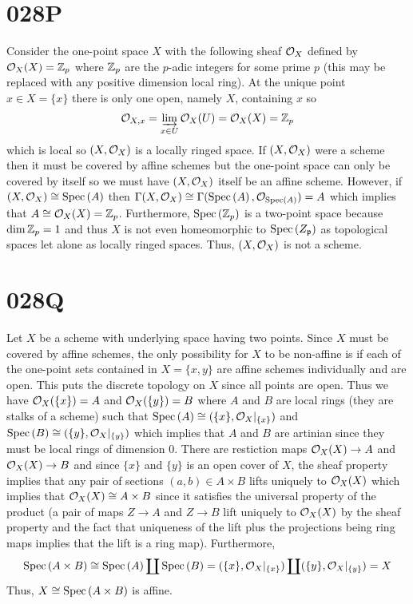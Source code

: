 \documentclass[12pt]{article}
\begin{document}
\section{028P}

Consider the one-point space $X$ with the following sheaf $\mathcal{O}_{X}$ defined by $\mathcal{O}_{X}(X) = \mathbb{Z}_p$ where $\mathbb{Z}_p$ are the $p$-adic integers for some prime $p$ (this may be replaced with any positive dimension local ring). At the unique point $x \in X = \{x\}$ there is only one open, namely $X$, containing $x$ so 
\[ \mathcal{O}_{X, x} = \varinjlim\limits_{x \in U} \mathcal{O}_{X} (U) = \mathcal{O}_{X}(X) = \mathbb{Z}_p \]
which is local so $(X, \mathcal{O}_{X})$ is a locally ringed space. If $(X, \mathcal{O}_{X})$ were a scheme then it must be covered by affine schemes but the one-point space can only be covered by itself so we must have $(X, \mathcal{O}_{X})$ itself be an affine scheme. However, if $(X, \mathcal{O}_{X}) \cong \mathrm{Spec}\left( A \right)$ then $\Gamma(X, \mathcal{O}_{X}) \cong \Gamma(\mathrm{Spec}\left( A \right), \mathcal{O}_{\mathrm{Spec}\left( A \right)}) = A$ which implies that $A \cong \mathcal{O}_{X}(X) = \mathbb{Z}_p$. Furthermore, $\mathrm{Spec}\left( \mathbb{Z}_p \right)$ is a two-point space because $\dim{\mathbb{Z}_p} = 1$ and thus $X$ is not even homeomorphic to $\mathrm{Spec}\left( Z_{\mathfrak{p}} \right)$ as topological spaces let alone as locally ringed spaces. Thus, $(X, \mathcal{O}_{X})$ is not a scheme.  

\section{028Q}

Let $X$ be a scheme with underlying space having two points. Since $X$ must be covered by affine schemes, the only possibility for $X$ to be non-affine is if each of the one-point sets contained in $X = \{x, y\}$ are affine schemes individually and are open. This puts the discrete topology on $X$ since all points are open. Thus we have $\mathcal{O}_{X}(\{x\}) = A$ and $\mathcal{O}_{X}(\{y\}) = B$ where $A$ and $B$ are local rings (they are stalks of a scheme) such that $\mathrm{Spec}\left( A \right) \cong (\{x\}, \mathcal{O}_{X}|_{\{x\}})$ and $\mathrm{Spec}\left( B \right) \cong (\{y\}, \mathcal{O}_{X}|_{\{y\}})$ which implies that $A$ and $B$ are artinian since they must be local rings of dimension $0$. There are restiction maps $\mathcal{O}_{X}(X) \to A$ and $\mathcal{O}_{X}(X) \to B$ and since $\{x\}$ and $\{y\}$ is an open cover of $X$, the sheaf property implies that any pair of sections $(a, b) \in A \times B$ lifts uniquely to $\mathcal{O}_{X}(X)$ which implies that $\mathcal{O}_{X}(X) \cong A \times B$ since it satisfies the universal property of the product (a pair of maps $Z \to A$ and $Z \to B$ lift uniquely to $\mathcal{O}_{X}(X)$  by the sheaf property and the fact that uniqueness of the lift plus the projections being ring maps implies that the lift is a ring map). Furthermore, 
\[ \mathrm{Spec}\left( A \times B \right) \cong \mathrm{Spec}\left( A \right) \coprod \mathrm{Spec}\left( B \right) = (\{x\}, \mathcal{O}_{X}|_{\{x\}}) \coprod (\{y\}, \mathcal{O}_{X}|_{\{y\}}) = X \]
Thus, $X \cong \mathrm{Spec}\left( A \times B \right)$ is affine.    
\end{document}
